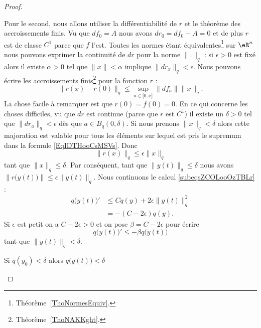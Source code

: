\begin{proof}
\begin{subproof}
    Pour le second, nous allons utiliser la différentiabilité de \( r\) et le théorème des accroissements finis. Vu que \( df_0=A\) nous avons \( dr_0=df_0-A=0\) et de plus \( r\) est de classe \( C^1\) parce que \( f\) l'est. Toutes les normes étant équivalentes\footnote{Théorème~\ref{ThoNormesEquiv}.} sur \( \eR^n\) nous pouvons exprimer la continuité de \( dr\) pour la norme \( \| . \|_q\) : si \( \epsilon>0\) est fixé alors il existe \( \alpha>0\) tel que \( \| x \|<\alpha\) implique \( \| dr_x \|_q<\epsilon\). Nous pouvons écrire les accroissements finis\footnote{Théorème~\ref{ThoNAKKght}.} pour la fonction \( r\) :
    \begin{equation}    \label{EqIDTHooCsMSVs}
        \| r(x)-r(0) \|_q\leq \sup_{a\in\mathopen[ 0 , x \mathclose]}\| df_a \|\| x \|_q.
    \end{equation}
    La chose facile à remarquer est que \( r(0)=f(0)=0\). En ce qui concerne les choses difficiles, vu que \( dr\) est continue (parce que \( r\) est \( C^1\)) il existe un \( \delta>0\) tel que \( \| dr_a \|_q<\epsilon\) dès que \( a\in B_q(0,\delta)\). Si nous prenons \( \| x \|_q<\delta\) alors cette majoration est valable pour tous les éléments sur lequel est pris le supremum dans la formule \eqref{EqIDTHooCsMSVs}. Donc
    \begin{equation}
        \| r(x) \|_q\leq \epsilon\| x \|_q
    \end{equation}
    tant que \( \| x \|_q\leq \delta\). Par conséquent, tant que \(  \| y(t) \|_q\leq \delta\) nous avons \( \| r\big( y(t) \big) \|\leq \epsilon\| y(t) \|_q\). Nous continuons le calcul \eqref{subeqsZCOLooOzTBLr} :
    \begin{subequations}
        \begin{align}
            q\big( y(t) \big)'&\leq Cq(y)+2\epsilon\| y(t) \|_q^2\\
            &=-(C-2\epsilon)q(y).
        \end{align}
    \end{subequations}
    Si \( \epsilon\) est petit on a \( C-2\epsilon >0 \) et on pose \( \beta=C-2\epsilon\) pour écrire
    \begin{equation}    \label{EqEYJIooHvSBic}
        q\big( y(t) \big)'\leq -\beta q\big( y(t) \big)
    \end{equation}
    tant que \( \| y(t) \|_q<\delta\).

\item[Si \( q(y_0)<\delta  \) alors \( q\big( y(t) \big) < \delta \)]


\end{subproof}
\end{proof}
